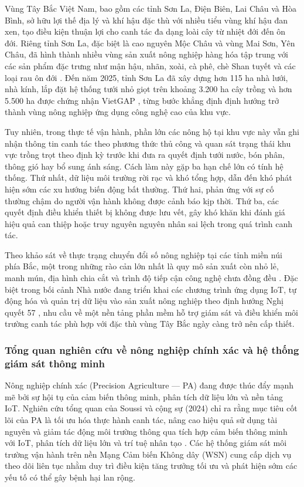 \documentclass[13pt,a4paper]{extarticle}
\numberwithin{figure}{section}
\numberwithin{table}{section}
\begin{document}
	Vùng Tây Bắc Việt Nam, bao gồm các tỉnh Sơn La, Điện Biên, Lai Châu và Hòa Bình, sở hữu lợi thế địa lý và khí hậu đặc thù với nhiều tiểu vùng khí hậu đan xen, tạo điều kiện thuận lợi cho canh tác đa dạng loài cây từ nhiệt đới đến ôn đới. Riêng tỉnh Sơn La, đặc biệt là cao nguyên Mộc Châu và vùng Mai Sơn, Yên Châu, đã hình thành nhiều vùng sản xuất nông nghiệp hàng hóa tập trung với các sản phẩm đặc trưng như mận hậu, nhãn, xoài, cà phê, chè Shan tuyết và các loại rau ôn đới \cite{cucThuongMai2018}. Đến năm 2025, tỉnh Sơn La đã xây dựng hơn 115 ha nhà lưới, nhà kính, lắp đặt hệ thống tưới nhỏ giọt trên khoảng 3.200 ha cây trồng và hơn 5.500 ha được chứng nhận VietGAP \cite{boKhoaHoc2025a}, từng bước khẳng định định hướng trở thành vùng nông nghiệp ứng dụng công nghệ cao của khu vực.
	
	Tuy nhiên, trong thực tế vận hành, phần lớn các nông hộ tại khu vực này vẫn ghi nhận thông tin canh tác theo phương thức thủ công và quan sát trạng thái khu vực trồng trọt theo định kỳ trước khi đưa ra quyết định tưới nước, bón phân, thông gió hay bổ sung ánh sáng. Cách làm này gặp ba hạn chế lớn có tính hệ thống. Thứ nhất, dữ liệu môi trường rời rạc và khó tổng hợp, dẫn đến khó phát hiện sớm các xu hướng biến động bất thường. Thứ hai, phản ứng với sự cố thường chậm do người vận hành không được cảnh báo kịp thời. Thứ ba, các quyết định điều khiển thiết bị không được lưu vết, gây khó khăn khi đánh giá hiệu quả can thiệp hoặc truy nguyên nguyên nhân sai lệch trong quá trình canh tác.
	
	Theo khảo sát về thực trạng chuyển đổi số nông nghiệp tại các tỉnh miền núi phía Bắc, một trong những rào cản lớn nhất là quy mô sản xuất còn nhỏ lẻ, manh mún, địa hình chia cắt và trình độ tiếp cận công nghệ chưa đồng đều \cite{boKhoaHoc2025b}. Đặc biệt trong bối cảnh Nhà nước đang triển khai các chương trình ứng dụng IoT, tự động hóa và quản trị dữ liệu vào sản xuất nông nghiệp theo định hướng Nghị quyết 57 \cite{boKhoaHoc2025a}, nhu cầu về một nền tảng phần mềm hỗ trợ giám sát và điều khiển môi trường canh tác phù hợp với đặc thù vùng Tây Bắc ngày càng trở nên cấp thiết.
	
	\subsubsection{Tổng quan nghiên cứu về nông nghiệp chính xác và hệ thống giám sát thông minh}
	
	Nông nghiệp chính xác (Precision Agriculture --- PA) đang được thúc đẩy mạnh mẽ bởi sự hội tụ của cảm biến thông minh, phân tích dữ liệu lớn và nền tảng IoT. Nghiên cứu tổng quan của Soussi và cộng sự (2024) chỉ ra rằng mục tiêu cốt lõi của PA là tối ưu hóa thực hành canh tác, nâng cao hiệu quả sử dụng tài nguyên và giảm tác động môi trường thông qua tích hợp cảm biến thông minh với IoT, phân tích dữ liệu lớn và trí tuệ nhân tạo \cite{soussi2024}. Các hệ thống giám sát môi trường vận hành trên nền Mạng Cảm biến Không dây (WSN) cung cấp dịch vụ theo dõi liên tục nhằm duy trì điều kiện tăng trưởng tối ưu và phát hiện sớm các yếu tố có thể gây bệnh hại lan rộng.
	
\end{document}
